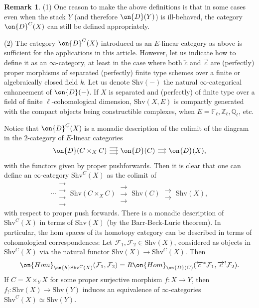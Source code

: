 \documentclass[11pt]{amsart}
\theoremstyle{definition}
\theoremstyle{definition}
\newtheorem{rmk}[thm]{Remark}
\theoremstyle{definition}
\numberwithin{equation}{subsection}
\newcommand{\bF}{{\mathbb F}}
\newcommand{\bQ}{{\mathbb Q}}
\newcommand{\bZ}{{\mathbb Z}}
\newcommand{\mF}{{\mathcal F}}
\newcommand{\Hom}{{\on{Hom}}}
\newcommand{\Shv}{\mathrm{Shv}}
\begin{document}
\begin{rmk}
\label{R: DC enh}
(1) 
One reason to make the above definitions is that in some cases even when the stack $Y$ (and therefore $\on{D}(Y)$) is ill-behaved, the category $\on{D}^C(X)$ can still be defined appropriately.  



(2) 
The category $\on{D}^C(X)$ introduced as an $E$-linear category as above is sufficient for the applications in this article. However, let us indicate how to define it as an $\infty$-category, at least in the case where both $\overleftarrow{c}$ and $\overrightarrow{c}$ are (perfectly) proper morphisms of separated (perfectly) finite type schemes over a finite or algebraically closed field $k$. Let us denote $\Shv(-)$ the natural $\infty$-categorical enhancement of $\on{D}(-)$. If $X$ is separated and (perfectly) of finite type over a field of finite $\ell$-cohomological dimension, $\Shv(X,E)$ is compactly generated with the compact objects being constructible complexes, when $E=\bF_\ell,\bZ_\ell, \bQ_\ell$, etc.


Notice that  $\on{D}^C(X)$ is a monadic description of the colimit of the diagram in the $2$-category of $E$-linear categories
\[\on{D}(C\times_XC)\ \substack{\longrightarrow\\[-1em] \longrightarrow \\[-1em] \longrightarrow}\ \on{D}(C)\ \substack{\longrightarrow\\[-1em] \longrightarrow} \ \on{D}(X),\]
with the functors given by proper pushforwards.
Then it is clear that one can define an $\infty$-category $\Shv^C(X)$ as the colimit of
\[\cdots \substack{\longrightarrow\\[-1em] \longrightarrow \\[-1em] \longrightarrow\\[-1em] \longrightarrow}\ \Shv(C\times_XC)\ \substack{\longrightarrow\\[-1em] \longrightarrow \\[-1em] \longrightarrow}\ \Shv(C)\ \substack{\longrightarrow\\[-1em] \longrightarrow} \ \Shv(X),\]
with respect to proper push forwards. 
There is a monadic description of $\Shv^C(X)$ in terms of $\Shv(X)$ (by the Barr-Beck-Lurie theorem). In particular, the hom spaces of its homotopy category can be described in terms of cohomological correspondences: Let $\mF_1,\mF_2\in \Shv(X)$, considered as objects in $\Shv^C(X)$ via the natural functor $\Shv(X)\to \Shv^C(X)$. Then 
$$\Hom_{\on{h}\Shv^C(X)}(\mF_1,\mF_2)=R\Hom_{\on{D}(C)}(\overleftarrow{c}^*\mF_1,\overrightarrow{c}^!\mF_2).$$
If $C=X\times_YX$ for some proper surjective morphism $f:X\to Y$, then $f_!:\Shv(X)\to \Shv(Y)$ induces an equivalence of $\infty$-categories $\Shv^C(X)\simeq \Shv(Y)$.
\end{rmk} 
\end{document}
